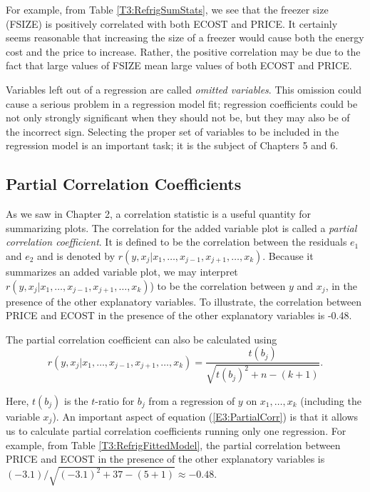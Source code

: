 For example, from Table \ref{T3:RefrigSumStats}, we see that the
freezer size (FSIZE) is positively correlated with both ECOST and
PRICE. It certainly seems reasonable that increasing the size of a
freezer would cause both the energy cost and the price to increase.
Rather, the positive correlation may be due to the fact that large
values of FSIZE mean large values of both ECOST and PRICE.

Variables left out of a regression are called \emph{omitted
variables}. This omission could cause a serious problem in a
regression model fit; regression coefficients could be not only
strongly significant when they should not be, but they may also be
of the incorrect sign. Selecting the proper set of variables to be
included in the regression model is an important task; it is the
subject of Chapters 5 and 6.

\subsection{Partial Correlation Coefficients}

As we saw in Chapter 2, a correlation statistic is a useful quantity
for summarizing plots. The correlation for the added variable plot
is called a \emph{partial correlation coefficient}. It is defined to
be the correlation between the residuals $e_1$ and $e_2$ and is
denoted by $ r(y,x_j|x_1,\ldots,x_{j-1},x_{j+1},\ldots,x_k) $.
Because it summarizes an added variable plot, we may interpret $
r(y,x_j|x_1,\ldots,x_{j-1},x_{j+1},\ldots,x_k)$) to be the
correlation between $y$ and $x_j$, in the presence of the other
explanatory variables. To illustrate, the correlation between PRICE
and ECOST in the presence of the other explanatory variables is
-0.48.

The partial correlation coefficient can also be calculated using
\begin{equation}\label{E3:PartialCorr}
r(y,x_j | x_1 ,\ldots, x_{j-1}, x_{j+1}, \ldots, x_k) =
\frac{t(b_j)}{\sqrt{t(b_j)^2 + n-(k+1)}}.
\end{equation}

\noindent Here, $t(b_j)$ is the $t$-ratio for $b_j$ from a
regression of $y$ on $x_1,\ldots,x_k$ (including the variable
$x_j$). An important aspect of equation (\ref{E3:PartialCorr}) is
that it allows us to calculate partial correlation coefficients
running only one regression. For example, from Table
\ref{T3:RefrigFittedModel}, the partial correlation between PRICE
and ECOST in the presence of the other explanatory variables is
$(-3.1)/\sqrt{(-3.1)^2+37-(5+1)}\approx -0.48$.

